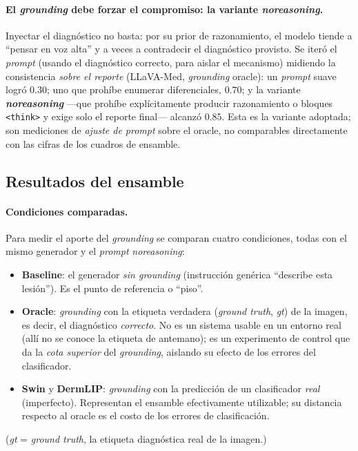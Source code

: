 \documentclass[11pt, a4paper]{article}
\begin{document}
\paragraph{El \emph{grounding} debe forzar el compromiso: la variante \emph{noreasoning}.} Inyectar el
diagnóstico no basta: por su prior de razonamiento, el modelo tiende a ``pensar en voz alta'' y a veces
a contradecir el diagnóstico provisto. Se iteró el \emph{prompt} (usando el diagnóstico correcto, para
aislar el mecanismo) midiendo la consistencia \emph{sobre el reporte} (LLaVA-Med, \emph{grounding} oracle):
un \emph{prompt} suave logró $0.30$; uno que prohíbe enumerar diferenciales, $0.70$; y la variante
\textbf{\emph{noreasoning}} —que prohíbe explícitamente producir razonamiento o bloques \texttt{<think>} y
exige solo el reporte final— alcanzó $0.85$. Esta es la variante adoptada; son mediciones de \emph{ajuste
de prompt} sobre el oracle, no comparables directamente con las cifras de los cuadros de ensamble.

\subsection{Resultados del ensamble}
\label{sec:res_ensamble}
\paragraph{Condiciones comparadas.} Para medir el aporte del \emph{grounding} se comparan cuatro
condiciones, todas con el mismo generador y el \emph{prompt} \emph{noreasoning}:
\begin{itemize}[leftmargin=1.6em]
  \item \textbf{Baseline}: el generador \emph{sin grounding} (instrucción genérica ``describe esta
  lesión''). Es el punto de referencia o ``piso''.
  \item \textbf{Oracle}: \emph{grounding} con la etiqueta verdadera (\emph{ground truth}, \emph{gt}) de
  la imagen, es decir, el diagnóstico \emph{correcto}. No es un sistema usable en un entorno real (allí
  no se conoce la etiqueta de antemano); es un experimento de control que da la \emph{cota superior} del
  \emph{grounding}, aislando su efecto de los errores del clasificador.
  \item \textbf{Swin} y \textbf{DermLIP}: \emph{grounding} con la predicción de un clasificador
  \emph{real} (imperfecto). Representan el ensamble efectivamente utilizable; su distancia respecto al
  oracle es el costo de los errores de clasificación.
\end{itemize}
(\emph{gt} = \emph{ground truth}, la etiqueta diagnóstica real de la imagen.)
\end{document}
